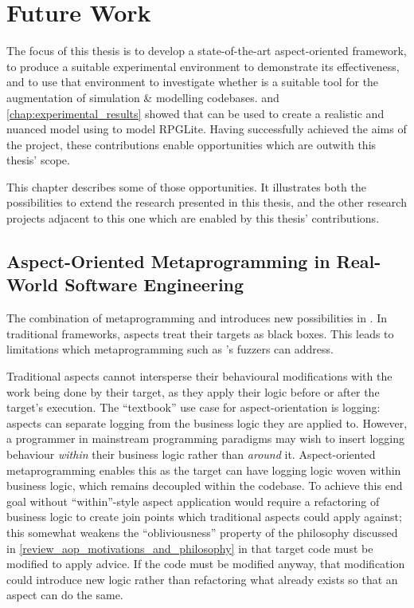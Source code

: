 \chapter{Future Work}\label{chap:future_work}

The focus of this thesis is to develop a state-of-the-art aspect-oriented
framework, to produce a suitable experimental environment to demonstrate its
effectiveness, and to use that environment to investigate whether
\aspectorientation{} is a suitable tool for the augmentation of simulation \&
modelling codebases.  and
\cref{chap:experimental_results} showed that \aspectorientation{} can be used to
create a realistic and nuanced model using \pdsfthree{} to model RPGLite. Having
successfully achieved the aims of the project, these contributions enable
opportunities which are outwith this thesis' scope.

This chapter describes some of those opportunities. It illustrates both the
possibilities to extend the research presented in this thesis, and the other
research projects adjacent to this one which are enabled by this thesis'
contributions.

\section{Aspect-Oriented Metaprogramming in Real-World Software Engineering}
\label{future_work_aspect_oriented_metaprogramming}

The combination of metaprogramming and \aspectorientation introduces new
possibilities in \aop{}. In traditional \aspectorientation frameworks, aspects
treat their targets as black boxes. This leads to limitations which
\aspectoriented{} metaprogramming such as \pdsfthree{}'s fuzzers can address.

Traditional aspects cannot intersperse their behavioural modifications with the
work being done by their target, as they apply their logic before or after the
target's execution. The ``textbook'' use case for aspect-orientation is logging:
aspects can separate logging from the business logic they are applied to.
However, a programmer in mainstream programming paradigms may wish to insert
logging behaviour \emph{within} their business logic rather than \emph{around}
it. Aspect-oriented metaprogramming enables this as the target can have logging
logic woven within business logic, which remains decoupled within the codebase.
To achieve this end goal without ``within''-style aspect application would
require a refactoring of business logic to create join points which traditional
aspects could apply against; this somewhat weakens the ``obliviousness'' property of the
\aspectoriented{} philosophy discussed in
\cref{review_aop_motivations_and_philosophy} in that target code must be modified
to apply advice. If the code must be modified anyway, that modification could
introduce new logic rather than refactoring what already exists so that an
aspect can do the same. 

